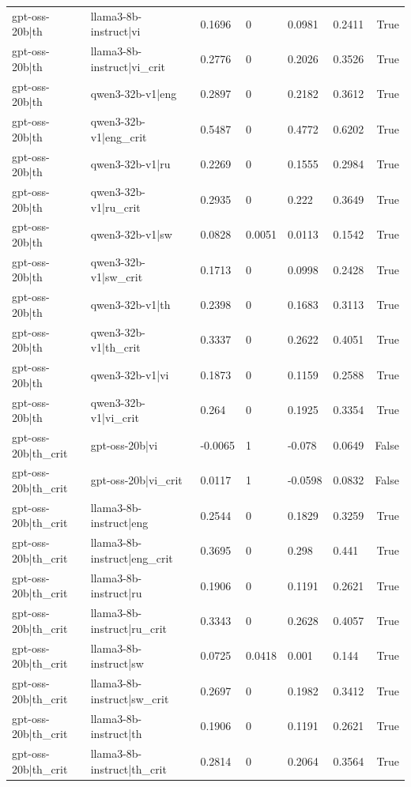 \begin{table}
\begin{tabular}{llllllr}
gpt-oss-20b|th & llama3-8b-instruct|vi & 0.1696 & 0 & 0.0981 & 0.2411 & True \\
gpt-oss-20b|th & llama3-8b-instruct|vi_crit & 0.2776 & 0 & 0.2026 & 0.3526 & True \\
gpt-oss-20b|th & qwen3-32b-v1|eng & 0.2897 & 0 & 0.2182 & 0.3612 & True \\
gpt-oss-20b|th & qwen3-32b-v1|eng_crit & 0.5487 & 0 & 0.4772 & 0.6202 & True \\
gpt-oss-20b|th & qwen3-32b-v1|ru & 0.2269 & 0 & 0.1555 & 0.2984 & True \\
gpt-oss-20b|th & qwen3-32b-v1|ru_crit & 0.2935 & 0 & 0.222 & 0.3649 & True \\
gpt-oss-20b|th & qwen3-32b-v1|sw & 0.0828 & 0.0051 & 0.0113 & 0.1542 & True \\
gpt-oss-20b|th & qwen3-32b-v1|sw_crit & 0.1713 & 0 & 0.0998 & 0.2428 & True \\
gpt-oss-20b|th & qwen3-32b-v1|th & 0.2398 & 0 & 0.1683 & 0.3113 & True \\
gpt-oss-20b|th & qwen3-32b-v1|th_crit & 0.3337 & 0 & 0.2622 & 0.4051 & True \\
gpt-oss-20b|th & qwen3-32b-v1|vi & 0.1873 & 0 & 0.1159 & 0.2588 & True \\
gpt-oss-20b|th & qwen3-32b-v1|vi_crit & 0.264 & 0 & 0.1925 & 0.3354 & True \\
gpt-oss-20b|th_crit & gpt-oss-20b|vi & -0.0065 & 1 & -0.078 & 0.0649 & False \\
gpt-oss-20b|th_crit & gpt-oss-20b|vi_crit & 0.0117 & 1 & -0.0598 & 0.0832 & False \\
gpt-oss-20b|th_crit & llama3-8b-instruct|eng & 0.2544 & 0 & 0.1829 & 0.3259 & True \\
gpt-oss-20b|th_crit & llama3-8b-instruct|eng_crit & 0.3695 & 0 & 0.298 & 0.441 & True \\
gpt-oss-20b|th_crit & llama3-8b-instruct|ru & 0.1906 & 0 & 0.1191 & 0.2621 & True \\
gpt-oss-20b|th_crit & llama3-8b-instruct|ru_crit & 0.3343 & 0 & 0.2628 & 0.4057 & True \\
gpt-oss-20b|th_crit & llama3-8b-instruct|sw & 0.0725 & 0.0418 & 0.001 & 0.144 & True \\
gpt-oss-20b|th_crit & llama3-8b-instruct|sw_crit & 0.2697 & 0 & 0.1982 & 0.3412 & True \\
gpt-oss-20b|th_crit & llama3-8b-instruct|th & 0.1906 & 0 & 0.1191 & 0.2621 & True \\
gpt-oss-20b|th_crit & llama3-8b-instruct|th_crit & 0.2814 & 0 & 0.2064 & 0.3564 & True \\

\end{tabular}
\end{table}
